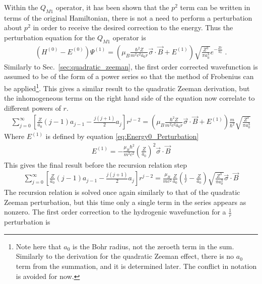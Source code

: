             Within the $Q_{M1}$ operator, it has been shown that the $p^2$ term can be written in terms of the original Hamiltonian, there is not a need to perform a perturbation about $p^2$ in order to receive the desired correction to the energy. Thus the perturbation equation for the $Q_{M1}$ operator is
            \begin{align}
                \left(H^{(0)} - E^{(0)}\right) \varPsi^{(1)} = \left(\mu_B \frac{\hbar^2 Z}{m^2 c^2 \bar{a}_0 r} \vec{\sigma} \cdot \vec{B} + E^{(1)} \right) \sqrt{\frac{Z^3}{\pi a_0^3}}e^{-\frac{Zr}{a_0}}\;.
            \end{align}
            \noindent Similarly to Sec.~\ref{sec:quadratic_zeeman}, the first order corrected wavefunction is assumed to be of the form of a power series so that the method of Frobenius can be applied\footnote{Note here that $a_0$ is the Bohr radius, not the zeroeth term in the sum. Similarly to the derivation for the quadratic Zeeman effect, there is no $a_0$ term from the summation, and it is determined later. The conflict in notation is avoided for now.}. This gives a similar result to the quadratic Zeeman derivation, but the inhomogeneous terms on the right hand side of the equation now correlate to different powers of $r$.\small
            \begin{align}
                \sum_{j = 0}^\infty \left[ \frac{Z}{\bar{a}_0}(j-1)a_{j-1} - \frac{j(j+1)}{2} a_j \right] r^{j -2} = \left(\mu_B \frac{\hbar^2 Z}{m^2 c^2 \bar{a}_0 r} \vec{\sigma} \cdot \vec{B} + E^{(1)} \right) \frac{m}{\hbar^2}\sqrt{\frac{Z^3}{\pi a_0^3}}
            \end{align}
            \normalsize
            \noindent Where $E^{(1)}$ is defined by equation \eqref{eq:Energy0_Perturbation}
            \begin{align}
                E^{(1)} = - \frac{\mu_B \hbar^2}{m^2c^2} \left( \frac{Z}{\bar{a}_0} \right)^2 \vec{\sigma}\cdot \vec{B}
            \end{align}
            \noindent This gives the final result before the recursion relation step
            \begin{align}
                \sum_{j = 0}^\infty \left[ \frac{Z}{\bar{a}_0}(j-1)a_{j-1} - \frac{j(j+1)}{2} a_j \right] r^{j -2} =  \frac{\mu_B}{m c^2} \frac{Z}{\bar{a}_0}\left(\frac{1}{r} - \frac{Z}{\bar{a}_0} \right) \sqrt{\frac{Z^3}{\pi a_0^3}}\vec{\sigma} \cdot \vec{B}
            \end{align}
            \noindent The recursion relation is solved once again similarly to that of the quadratic Zeeman perturbation, but this time only a single term in the series appears as nonzero. The first order correction to the hydrogenic wavefunction for a $\frac{1}{r}$ perturbation is 

